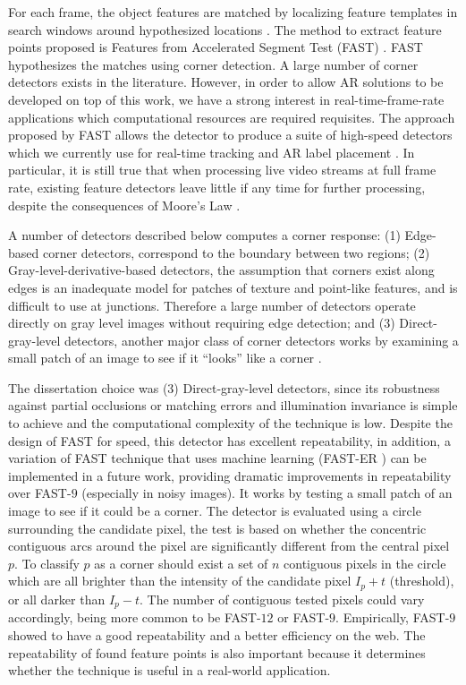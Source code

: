 For each frame, the object features are matched by localizing feature templates in search windows around hypothesized locations \cite{Lepetit2005}. The method to extract feature points proposed is Features from Accelerated Segment Test (FAST) \cite{Rosten2010,RostenFaster2010}. FAST hypothesizes the matches using corner detection. A large number of corner detectors exists in the literature. However, in order to allow AR solutions to be developed on top of this work, we have a strong interest in real-time-frame-rate applications which computational resources are required requisites. The approach proposed by FAST allows the detector to produce a suite of high-speed detectors which we currently use for real-time tracking and AR label placement \cite{Calonder2010}. In particular, it is still true that when processing live video streams at full frame rate, existing feature detectors leave little if any time for further processing, despite the consequences of Moore's Law \cite{Rosten2010}.

A number of detectors described below computes a corner response: (1) Edge-based corner detectors, correspond to the boundary between two regions; (2) Gray-level-derivative-based detectors, the assumption that corners exist along edges is an inadequate model for patches of texture and point-like features, and is difficult to use at junctions. Therefore a large number of detectors operate directly on gray level images without requiring edge detection; and (3) Direct-gray-level detectors, another major class of corner detectors works by examining a small patch of an image to see if it ``looks'' like a corner \cite{Rosten2010}.

The dissertation choice was (3) Direct-gray-level detectors, since its robustness against partial occlusions or matching errors and illumination invariance is simple to achieve and the computational complexity of the technique is low.
Despite the design of FAST for speed, this detector has excellent repeatability, in addition, a variation of FAST technique that uses machine learning (FAST-ER \cite{RostenFaster2010}) can be implemented in a future work, providing dramatic improvements in repeatability over FAST-$9$ (especially in noisy images). It works by testing a small patch of an image to see if it could be a corner. The detector is evaluated using a circle surrounding the candidate pixel, the test is based on whether the concentric contiguous arcs around the pixel are significantly different from the central pixel $p$. To classify $p$ as a corner should exist a set of $n$ contiguous pixels in the circle which are all brighter than the intensity of the candidate pixel $I_{p} + t$ (threshold), or all darker than $I_{p} - t$. The number of contiguous tested pixels could vary accordingly, being more common to be FAST-$12$ or FAST-$9$. Empirically, FAST-$9$ showed to have a good repeatability and a better efficiency on the web. The repeatability of found feature points is also important because it determines whether the technique is useful in a real-world application.

